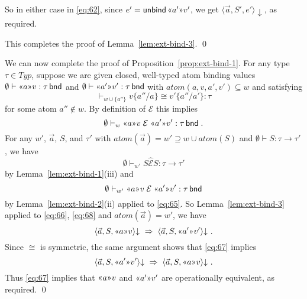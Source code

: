 \documentclass{LMCS}
\theoremstyle{plain}
\theoremstyle{definition}
\newcommand{\atm}[1][a]{#1}
\newcommand{\atoms}{\mathit{atom}}
\newcommand{\BINDTY}{\kw{bnd}}
\newcommand{\BINDVAL}[2]{\mathopen{\text{\normalfont\guillemotleft}}#1
  \mathclose{\text{\normalfont\guillemotright}}#2}
\newcommand{\config}[3]{\langle#1, #2, #3\rangle}
\newcommand{\CR}[1]{\mathrel{\widehat{#1}}}
\newcommand{\ent}{\vdash}
\newcommand{\enty}{\vdash}
\newcommand{\er}{\mathrel{\mathcal{E}}}
\renewcommand{\exp}[1][e]{#1}
\newcommand{\FUNTY}{\mathbin{\rightarrow}}
\newcommand{\imp}{\Rightarrow}
\newcommand{\kw}[1]{\mathsf{#1}}
\newcommand{\ofty}{:}
\newcommand{\opeq}{\cong}
\newcommand{\rename}[2]{\{#2/#1\}}
\newcommand{\s}[1][a]{\vec{#1}}
\newcommand{\stk}[1][S]{#1}
\newcommand{\terminates}[1][]{{\downarrow_{#1}}}
\newcommand{\ty}{\tau}
\newcommand{\Ty}{\mathit{Typ}}
\newcommand{\UNBIND}{\kw{unbind}}
\newcommand{\val}[1][v]{#1}
\newcommand{\w}[1][w]{#1}
\begin{document}
  So in either case in \eqref{eq:62}, since
  $\exp'=\UNBIND\,\BINDVAL{\atm'}{\val'}$, we get
  $\config{\s}{\stk'}{\exp'}\terminates$, as required.

    \bigskip\noindent 
    This completes the proof of Lemma~\ref{lem:ext-bind-3}.
\qed

We can now complete the proof of Proposition~\ref{prop:ext-bind-1}.
For any type $\ty\in\Ty$, suppose we are given closed, well-typed atom
binding values $\emptyset\enty\BINDVAL{\atm}{\val}\ofty\ty\,\BINDTY$
and $\emptyset\enty\BINDVAL{\atm'}{\val'}\ofty\ty\,\BINDTY$ with
$\atoms(\atm,\val,\atm',\val')\subseteq\w$ and satisfying
\begin{equation}
  \label{eq:67}
  {}\ent_{\w\cup\{\atm''\}}\val\rename{\atm}{\atm''} \opeq
  \val'\rename{\atm'}{\atm''} \ofty \ty
\end{equation}
for some atom $\atm''\notin\w$. By definition of $\er$ this implies
\begin{equation}
  \label{eq:65}
  \emptyset\ent_{\w} \BINDVAL{\atm}{\val} \er \BINDVAL{\atm'}{\val'}
  \ofty \ty\,\BINDTY\;. 
\end{equation}
For any $\w'$, $\s$, $\stk$, and $\ty'$ with
$\atoms(\s)=\w'\supseteq\w\cup\atoms(\stk) $ and
$\emptyset\enty\stk\ofty\ty\FUNTY\ty'$, we have
\begin{equation}
  \label{eq:66}
  \emptyset\ent_{\w'} \stk\CR{\er} \stk\ofty
\ty\FUNTY\ty'
\end{equation}
by Lemma~\ref{lem:ext-bind-1}(iii) and
\begin{equation}
  \label{eq:68}
  \emptyset\ent_{\w'} \BINDVAL{\atm}{\val} \er \BINDVAL{\atm'}{\val'}
  \ofty \ty\,\BINDTY
\end{equation}
by Lemma~\ref{lem:ext-bind-2}(ii) applied to \eqref{eq:65}.
So Lemma~\ref{lem:ext-bind-3}
applied to \eqref{eq:66}, \eqref{eq:68} and $\atoms(\s)=\w'$, we have
\[
\config{\s}{\stk}{\BINDVAL{\atm}{\val}}\terminates
\;\imp\;
\config{\s}{\stk}{\BINDVAL{\atm'}{\val'}}\terminates\;.
\]
Since $\opeq$ is symmetric, the same argument shows that \eqref{eq:67}
implies
\[
\config{\s}{\stk}{\BINDVAL{\atm'}{\val'}}\terminates \;\imp\;
\config{\s}{\stk}{\BINDVAL{\atm}{\val}}\terminates\;.
\]
Thus \eqref{eq:67} implies that $\BINDVAL{\atm}{\val}$ and
$\BINDVAL{\atm'}{\val'}$ are operationally equivalent, as required.
\qed
\end{document}
